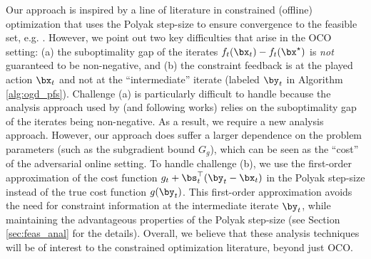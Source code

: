 Our approach is inspired by a line of literature in constrained (offline) optimization that uses the Polyak step-size to ensure convergence to the feasible set, e.g. \cite{polyak2001random,nedic2011random,nedic2019random,necoara2022stochastic}.
However, we point out two key difficulties that arise in the OCO setting: (a) the suboptimality gap of the iterates $f_t(\bx_t) - f_t(\bx^\star)$ is \emph{not} guaranteed to be non-negative, and (b) the constraint feedback is at the played action $\bx_t$ and not at the ``intermediate'' iterate (labeled $\by_t$ in Algorithm \ref{alg:ogd_pfs}).
Challenge (a) is particularly difficult to handle because the analysis approach used by \citet{nedic2011random} (and following works) relies on the suboptimality gap of the iterates being non-negative.
As a result, we require a new analysis approach.
However, our approach does suffer a larger dependence on the problem parameters (such as the subgradient bound $G_g$), which can be seen as the ``cost'' of the adversarial online setting.
To handle challenge (b), we use the first-order approximation of the cost function $g_t + \bs_t^\top (\by_t - \bx_t)$ in the Polyak step-size instead of the true cost function $g(\by_t)$.
This first-order approximation avoids the need for constraint information at the intermediate iterate $\by_t$, while maintaining the advantageous properties of the Polyak step-size (see Section \ref{sec:feas_anal} for the details).
Overall, we believe that these analysis techniques will be of interest to the constrained optimization literature, beyond just OCO.